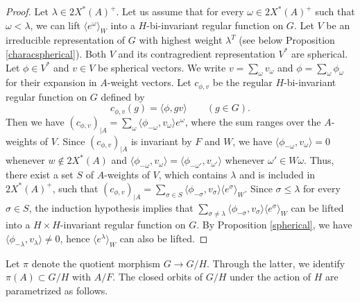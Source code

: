 \documentclass{amsart}
\theoremstyle{definition}
\begin{document}
\begin{proof}
    Let $\lambda \in 2X^*(A)^+$. Let us assume that for every $\omega \in 2X^*(A)^+$ such that $\omega\! <\! \lambda$, we can lift $\langle e^\omega\rangle_{W}$ into a $H$-bi-invariant regular function on $G$. Let $V$ be an irreducible representation of $G$ with highest weight $\lambda^T$ (see below Proposition \ref{characspherical}). Both $V$ and its contragredient representation $V^*$ are spherical. Let $\phi \in V^*$ and $v \in V$ be spherical vectors. We write $v = \sum_\omega v_\omega$ and $\phi = \sum_\omega \phi_\omega$ for their expansion in $A$-weight vectors. Let $c_{\phi,v}$ be the regular $H$-bi-invariant regular function on $G$ defined by
    $$c_{\phi,v}(g) = \langle \phi, gv\rangle \qquad (g \in G).$$
    Then we have $(c_{\phi,v})_{|A} = \sum_\omega \langle \phi_{-\omega}, v_\omega\rangle e^\omega$, where the sum ranges over the $A$-weights of $V$. Since $(c_{\phi,v})_{|A}$ is invariant by $F$ and $W$, we have $\langle \phi_{-\omega}, v_\omega\rangle = 0$ whenever $w \notin 2X^*(A)$ and $\langle \phi_{-\omega}, v_\omega\rangle = \langle \phi_{-\omega'}, v_{\omega'}\rangle$ whenever $\omega' \in W \omega$. Thus, there exist a set $S$ of $A$-weights of $V$, which contains $\lambda$ and is included in $2X^*(A)^+$, such that $(c_{\phi,v})_{|A} = \sum_{\sigma\in S} \langle \phi_{-\sigma}, v_\sigma\rangle \langle e^\sigma \rangle_W$. Since $\sigma \leq \lambda$ for every $\sigma \in S$, the induction hypothesis implies that $\sum_{\sigma \neq \lambda} \langle \phi_{-\sigma}, v_\sigma\rangle \langle e^\sigma \rangle_W$ can be lifted into a $H\times H$-invariant regular function on $G$. By Proposition \ref{spherical}, we have $\langle \phi_{-\lambda},v_\lambda\rangle \neq 0$, hence $\langle e^\lambda\rangle_W$ can also be lifted.
\end{proof}

Let $\pi$ denote the quotient morphism $G \to G/H$. Through the latter, we identify $\pi(A) \subset G/H$ with $A/F$. The closed orbits of $G/H$ under the action of $H$ are parametrized as follows.
\end{document}
